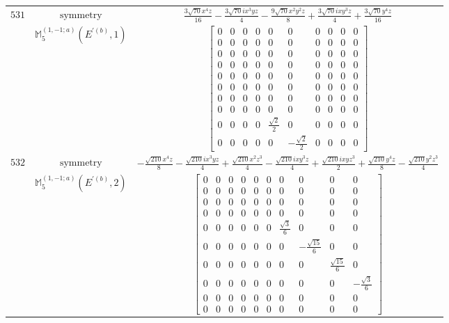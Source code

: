 \documentclass[fleqn,8pt,landscape]{jsarticle}
\begin{document}
\begin{longtable}{ccc}
$ 531 $ & $ \text{symmetry} $ & $ \frac{3 \sqrt{70} x^{4} z}{16} - \frac{3 \sqrt{70} i x^{3} y z}{4} - \frac{9 \sqrt{70} x^{2} y^{2} z}{8} + \frac{3 \sqrt{70} i x y^{3} z}{4} + \frac{3 \sqrt{70} y^{4} z}{16} $ \\
$  $ & $ \mathbb{M}_{5}^{(1,-1;a)}(E^{\prime(b)},1) $ & $ \begin{bmatrix} 0 & 0 & 0 & 0 & 0 & 0 & 0 & 0 & 0 & 0 \\ 0 & 0 & 0 & 0 & 0 & 0 & 0 & 0 & 0 & 0 \\ 0 & 0 & 0 & 0 & 0 & 0 & 0 & 0 & 0 & 0 \\ 0 & 0 & 0 & 0 & 0 & 0 & 0 & 0 & 0 & 0 \\ 0 & 0 & 0 & 0 & 0 & 0 & 0 & 0 & 0 & 0 \\ 0 & 0 & 0 & 0 & 0 & 0 & 0 & 0 & 0 & 0 \\ 0 & 0 & 0 & 0 & 0 & 0 & 0 & 0 & 0 & 0 \\ 0 & 0 & 0 & 0 & 0 & 0 & 0 & 0 & 0 & 0 \\ 0 & 0 & 0 & 0 & \frac{\sqrt{2}}{2} & 0 & 0 & 0 & 0 & 0 \\ 0 & 0 & 0 & 0 & 0 & - \frac{\sqrt{2}}{2} & 0 & 0 & 0 & 0 \end{bmatrix} $ \\ \hline
$ 532 $ & $ \text{symmetry} $ & $ - \frac{\sqrt{210} x^{4} z}{8} - \frac{\sqrt{210} i x^{3} y z}{4} + \frac{\sqrt{210} x^{2} z^{3}}{4} - \frac{\sqrt{210} i x y^{3} z}{4} + \frac{\sqrt{210} i x y z^{3}}{2} + \frac{\sqrt{210} y^{4} z}{8} - \frac{\sqrt{210} y^{2} z^{3}}{4} $ \\
$  $ & $ \mathbb{M}_{5}^{(1,-1;a)}(E^{\prime(b)},2) $ & $ \begin{bmatrix} 0 & 0 & 0 & 0 & 0 & 0 & 0 & 0 & 0 & 0 \\ 0 & 0 & 0 & 0 & 0 & 0 & 0 & 0 & 0 & 0 \\ 0 & 0 & 0 & 0 & 0 & 0 & 0 & 0 & 0 & 0 \\ 0 & 0 & 0 & 0 & 0 & 0 & 0 & 0 & 0 & 0 \\ 0 & 0 & 0 & 0 & 0 & 0 & \frac{\sqrt{3}}{6} & 0 & 0 & 0 \\ 0 & 0 & 0 & 0 & 0 & 0 & 0 & - \frac{\sqrt{15}}{6} & 0 & 0 \\ 0 & 0 & 0 & 0 & 0 & 0 & 0 & 0 & \frac{\sqrt{15}}{6} & 0 \\ 0 & 0 & 0 & 0 & 0 & 0 & 0 & 0 & 0 & - \frac{\sqrt{3}}{6} \\ 0 & 0 & 0 & 0 & 0 & 0 & 0 & 0 & 0 & 0 \\ 0 & 0 & 0 & 0 & 0 & 0 & 0 & 0 & 0 & 0 \end{bmatrix} $ \\ \hline

\end{longtable}
\end{document}
